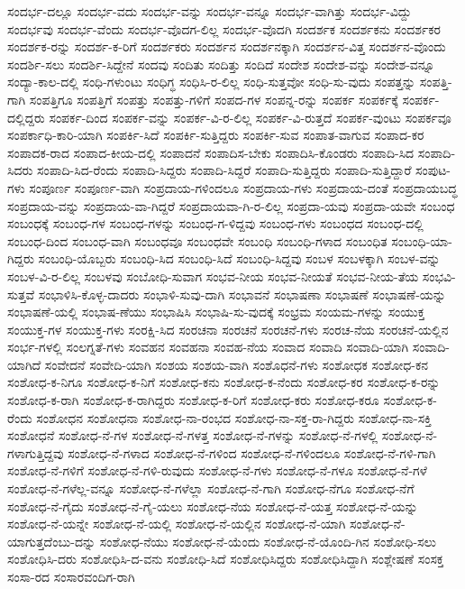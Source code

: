 {ಸಂದರ್ಭ-ದಲ್ಲೂ
ಸಂದರ್ಭ-ವದು
ಸಂದರ್ಭ-ವನ್ನು
ಸಂದರ್ಭ-ವನ್ನೂ
ಸಂದರ್ಭ-ವಾಗಿತ್ತು
ಸಂದರ್ಭ-ವಿದ್ದು
ಸಂದರ್ಭವು
ಸಂದರ್ಭ-ವೆಂದು
ಸಂದರ್ಭ-ವೊದಗ-ಲಿಲ್ಲ
ಸಂದರ್ಭ-ವೊದಗಿ
ಸಂದರ್ಶಕ
ಸಂದರ್ಶಕನು
ಸಂದರ್ಶಕರ
ಸಂದರ್ಶಕ-ರನ್ನು
ಸಂದರ್ಶ-ಕ-ರಿಗೆ
ಸಂದರ್ಶಕರು
ಸಂದರ್ಶನ
ಸಂದರ್ಶನಕ್ಕಾಗಿ
ಸಂದರ್ಶನ-ವಿತ್ತ
ಸಂದರ್ಶನ-ವೊಂದು
ಸಂದರ್ಶಿ-ಸಲು
ಸಂದರ್ಶಿ-ಸಿದ್ದೇನೆ
ಸಂದವು
ಸಂದಿತು
ಸಂದಿತ್ತು
ಸಂದಿದೆ
ಸಂದೇಶ
ಸಂದೇಶ-ವನ್ನು
ಸಂದೇಶ-ವನ್ನೂ
ಸಂದ್ಯಾ-ಕಾಲ-ದಲ್ಲಿ
ಸಂಧಿ-ಗಳುಂಟು
ಸಂಧಿಗ್ಧ
ಸಂಧಿಸಿ-ರ-ಲಿಲ್ಲ
ಸಂಧಿ-ಸುತ್ತವೋ
ಸಂಧಿ-ಸು-ವುದು
ಸಂಪತ್ತನ್ನು
ಸಂಪತ್ತಿ-ಗಾಗಿ
ಸಂಪತ್ತಿಗೂ
ಸಂಪತ್ತಿಗೆ
ಸಂಪತ್ತು
ಸಂಪತ್ತು-ಗಳಿಗೆ
ಸಂಪದ-ಗಳ
ಸಂಪನ್ನ-ರನ್ನು
ಸಂಪರ್ಕ
ಸಂಪರ್ಕಕ್ಕೆ
ಸಂಪರ್ಕ-ದಲ್ಲಿದ್ದರು
ಸಂಪರ್ಕ-ದಿಂದ
ಸಂಪರ್ಕ-ವನ್ನು
ಸಂಪರ್ಕ-ವಿ-ರ-ಲಿಲ್ಲ
ಸಂಪರ್ಕ-ವಿ-ರುತ್ತದೆ
ಸಂಪರ್ಕ-ವುಂಟು
ಸಂಪರ್ಕವೂ
ಸಂಪರ್ಕಾಧಿ-ಕಾರಿ-ಯಾಗಿ
ಸಂಪರ್ಕಿ-ಸಿದೆ
ಸಂಪರ್ಕಿ-ಸುತ್ತಿದ್ದರು
ಸಂಪರ್ಕಿ-ಸುವ
ಸಂಪಾತ-ವಾಗುವ
ಸಂಪಾದ-ಕರ
ಸಂಪಾದಕ-ರಾದ
ಸಂಪಾದ-ಕೀಯ-ದಲ್ಲಿ
ಸಂಪಾದನೆ
ಸಂಪಾದಿಸ-ಬೇಕು
ಸಂಪಾದಿಸಿ-ಕೊಂಡರು
ಸಂಪಾದಿ-ಸಿದ
ಸಂಪಾದಿ-ಸಿದರು
ಸಂಪಾದಿ-ಸಿದ-ರೆಂದು
ಸಂಪಾದಿ-ಸಿದ್ದರು
ಸಂಪಾದಿ-ಸಿದ್ದರೆ
ಸಂಪಾದಿ-ಸುತ್ತಿದ್ದರು
ಸಂಪಾದಿ-ಸುತ್ತಿದ್ದಾರೆ
ಸಂಪುಟ-ಗಳು
ಸಂಪೂರ್ಣ
ಸಂಪೂರ್ಣ-ವಾಗಿ
ಸಂಪ್ರದಾಯ-ಗಳಿಂದಲೂ
ಸಂಪ್ರದಾಯ-ಗಳು
ಸಂಪ್ರದಾಯ-ದಂತೆ
ಸಂಪ್ರದಾಯಬದ್ಧ
ಸಂಪ್ರದಾಯ-ವನ್ನು
ಸಂಪ್ರದಾಯ-ವಾ-ಗಿದ್ದರೆ
ಸಂಪ್ರದಾಯವಾ-ಗಿ-ರ-ಲಿಲ್ಲ
ಸಂಪ್ರದಾ-ಯವು
ಸಂಪ್ರದಾ-ಯವೇ
ಸಂಬಂಧ
ಸಂಬಂಧಕ್ಕೆ
ಸಂಬಂಧ-ಗಳ
ಸಂಬಂಧ-ಗಳನ್ನು
ಸಂಬಂಧ-ಗ-ಳಿದ್ದವು
ಸಂಬಂಧ-ಗಳು
ಸಂಬಂಧದ
ಸಂಬಂಧ-ದಲ್ಲಿ
ಸಂಬಂಧ-ದಿಂದ
ಸಂಬಂಧ-ವಾಗಿ
ಸಂಬಂಧವೂ
ಸಂಬಂಧವೇ
ಸಂಬಂಧಿ
ಸಂಬಂಧಿ-ಗಳಾದ
ಸಂಬಂಧಿತ
ಸಂಬಂಧಿ-ಯಾ-ಗಿದ್ದರು
ಸಂಬಂಧಿ-ಯೊಬ್ಬರು
ಸಂಬಂಧಿ-ಸಿದ
ಸಂಬಂಧಿ-ಸಿದೆ
ಸಂಬಂಧಿ-ಸಿದ್ದವು
ಸಂಬಳ
ಸಂಬಳಕ್ಕಾಗಿ
ಸಂಬಳ-ವನ್ನು
ಸಂಬಳ-ವಿ-ರ-ಲಿಲ್ಲ
ಸಂಬಳವು
ಸಂಬೋಧಿ-ಸುವಾಗ
ಸಂಭವ-ನೀಯ
ಸಂಭವ-ನೀಯತೆ
ಸಂಭವ-ನೀಯ-ತೆಯ
ಸಂಭವಿ-ಸುತ್ತವೆ
ಸಂಭಾಳಿಸಿ-ಕೊಳ್ಳ-ದಾದರು
ಸಂಭಾಳಿ-ಸುವು-ದಾಗಿ
ಸಂಭಾವನೆ
ಸಂಭಾಷಣಾ
ಸಂಭಾಷಣೆ
ಸಂಭಾಷಣೆ-ಯನ್ನು
ಸಂಭಾಷಣೆ-ಯಲ್ಲಿ
ಸಂಭಾಷ-ಣೆಯು
ಸಂಭಾಷಿಸಿ
ಸಂಭಾಷಿ-ಸು-ವುದಕ್ಕೆ
ಸಂಭ್ರಮ
ಸಂಯಮ-ಗಳನ್ನು
ಸಂಯುಕ್ತ
ಸಂಯುಕ್ತ-ಗಳ
ಸಂಯುಕ್ತ-ಗಳು
ಸಂರಕ್ಷಿ-ಸಿದ
ಸಂರಚನಾ
ಸಂರಚನೆ
ಸಂರಚನೆ-ಗಳು
ಸಂರಚ-ನೆಯ
ಸಂರಚನೆ-ಯಲ್ಲಿನ
ಸಂರ್ಭ-ಗಳಲ್ಲಿ
ಸಂಲಗ್ನತೆ-ಗಳು
ಸಂವಹನ
ಸಂವಹನಾ
ಸಂವಹ-ನೆಯ
ಸಂವಾದ
ಸಂವಾದಿ
ಸಂವಾದಿ-ಯಾಗಿ
ಸಂವಾದಿ-ಯಾಗಿದೆ
ಸಂವೇದನೆ
ಸಂವೇದಿ-ಯಾಗಿ
ಸಂಶಯ
ಸಂಶಯ-ವಾಗಿ
ಸಂಶೊಧನೆ-ಗಳು
ಸಂಶೋಧಕ
ಸಂಶೋಧ-ಕನ
ಸಂಶೋಧ-ಕ-ನಿಗೂ
ಸಂಶೋಧ-ಕ-ನಿಗೆ
ಸಂಶೋಧ-ಕನು
ಸಂಶೋಧ-ಕ-ನೆಂದು
ಸಂಶೋಧ-ಕರ
ಸಂಶೋಧ-ಕ-ರನ್ನು
ಸಂಶೋಧ-ಕ-ರಾಗಿ
ಸಂಶೋಧ-ಕ-ರಾಗಿದ್ದರು
ಸಂಶೋಧ-ಕ-ರಿಗೆ
ಸಂಶೋಧ-ಕರು
ಸಂಶೋಧ-ಕರೂ
ಸಂಶೋಧ-ಕ-ರೆಂದು
ಸಂಶೋಧನ
ಸಂಶೋಧನಾ
ಸಂಶೋಧ-ನಾ-ರಂಭದ
ಸಂಶೋಧ-ನಾ-ಸಕ್ತ-ರಾ-ಗಿದ್ದರು
ಸಂಶೋಧ-ನಾ-ಸಕ್ತಿ
ಸಂಶೋಧನೆ
ಸಂಶೋಧ-ನೆ-ಗಳ
ಸಂಶೋಧ-ನೆ-ಗಳತ್ತ
ಸಂಶೋಧ-ನೆ-ಗಳನ್ನು
ಸಂಶೋಧ-ನೆ-ಗಳಲ್ಲಿ
ಸಂಶೋಧ-ನೆ-ಗಳಾಗುತ್ತಿದ್ದವು
ಸಂಶೋಧ-ನೆ-ಗಳಾದ
ಸಂಶೋಧ-ನೆ-ಗಳಿಂದ
ಸಂಶೋಧ-ನೆ-ಗಳಿಂದಲೂ
ಸಂಶೋಧ-ನೆ-ಗಳಿ-ಗಾಗಿ
ಸಂಶೋಧ-ನೆ-ಗಳಿಗೆ
ಸಂಶೋಧ-ನೆ-ಗಳಿ-ರುವುದು
ಸಂಶೋಧ-ನೆ-ಗಳು
ಸಂಶೋಧ-ನೆ-ಗಳೂ
ಸಂಶೋಧ-ನೆ-ಗಳೆ
ಸಂಶೋಧ-ನೆ-ಗಳೆಲ್ಲ-ವನ್ನೂ
ಸಂಶೋಧ-ನೆ-ಗಳೆಲ್ಲಾ
ಸಂಶೋಧ-ನೆ-ಗಾಗಿ
ಸಂಶೋಧ-ನೆಗೂ
ಸಂಶೋಧ-ನೆಗೆ
ಸಂಶೋಧ-ನೆ-ಗೈದು
ಸಂಶೋಧ-ನೆ-ಗೈ-ಯಲು
ಸಂಶೋಧ-ನೆಯ
ಸಂಶೋಧ-ನೆ-ಯತ್ತ
ಸಂಶೋಧ-ನೆ-ಯನ್ನು
ಸಂಶೋಧ-ನೆ-ಯನ್ನೇ
ಸಂಶೋಧ-ನೆ-ಯಲ್ಲಿ
ಸಂಶೋಧ-ನೆ-ಯಲ್ಲಿನ
ಸಂಶೋಧ-ನೆ-ಯಾಗಿ
ಸಂಶೋಧ-ನೆ-ಯಾಗುತ್ತದೆಂಬು-ದನ್ನು
ಸಂಶೋಧ-ನೆಯು
ಸಂಶೋಧ-ನೆ-ಯೆಂದು
ಸಂಶೋಧ-ನೆ-ಯೊಂದಿ-ಗಿನ
ಸಂಶೋಧಿ-ಸಲು
ಸಂಶೋಧಿಸಿ-ದರು
ಸಂಶೋಧಿಸಿ-ದ-ವನು
ಸಂಶೋಧಿ-ಸಿದೆ
ಸಂಶೋಧಿಸಿದ್ದರು
ಸಂಶೋಧಿಸಿದ್ದಾಗಿ
ಸಂಶ್ಲೇಷಣೆ
ಸಂಸಕ್ತ
ಸಂಸಾ-ರದ
ಸಂಸಾರವಂದಿಗ-ರಾಗಿ
}
